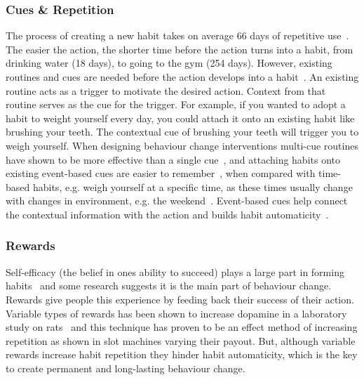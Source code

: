 \documentclass{scaffold/sigchi}
\begin{document}
\subsubsection{Cues \& Repetition}
The process of creating a new habit takes on average 66 days of repetitive use~\cite{article_how_habits_formed_modelling_habit_formation}. The easier the action, the shorter time before the action turns into a habit, from drinking water (18 days), to going to the gym (254 days). However, existing routines and cues are needed before the action develops into a habit~\cite{habits_event_cues_1, habits_event_cues_2}. An existing routine acts as a trigger to motivate the desired action. Context from that routine serves as the cue for the trigger. For example, if you wanted to adopt a habit to weight yourself every day, you could attach it onto an existing habit like brushing your teeth. The contextual cue of brushing your teeth will trigger you to weigh yourself. When designing behaviour change interventions multi-cue routines have shown to be more effective than a single cue~\cite{article_understanding_use_contextual_cues_design_impl}, and attaching habits onto existing event-based cues are easier to remember~\cite{article_implementation_intentions_multicue}, when compared with time-based habits, e.g. weigh yourself at a specific time, as these times usually change with changes in environment, e.g. the weekend~\cite{coaching_not_that_good}. Event-based cues help connect the contextual information with the action and builds habit automaticity~\cite{article_implementation_intentions}.
 
 
\subsubsection{Rewards}
Self-efficacy (the belief in ones ability to succeed) plays a large part in forming habits~\cite{article_a_self_efficacy} and some research suggests it is the main part of behaviour change. Rewards give people this experience by feeding back their success of their action. Variable types of rewards has been shown to increase dopamine in a laboratory study on rats~\cite{variable_rewards_increases_dopamine} and this technique has proven to be an effect method of increasing repetition as shown in slot machines varying their payout. But, although variable rewards increase habit repetition they hinder habit automaticity, which is the key to create permanent and long-lasting behaviour change.
\end{document}
